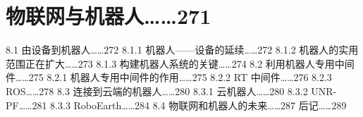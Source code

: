 \documentclass[12pt,UTF8]{ctexbook}
\begin{document}
\chapter{物联网与机器人……271}
8.1
由设备到机器人……272
8.1.1
机器人——设备的延续……272
8.1.2
机器人的实用范围正在扩大……273
8.1.3
构建机器人系统的关键……274
8.2
利用机器人专用中间件……275
8.2.1
机器人专用中间件的作用……275
8.2.2
RT 中间件……276
8.2.3
ROS……278
8.3
连接到云端的机器人……280
8.3.1
云机器人……280
8.3.2
UNR-PF……281
8.3.3
RoboEarth……284
8.4
物联网和机器人的未来……287
后记……289


\backmatter
\end{document}
